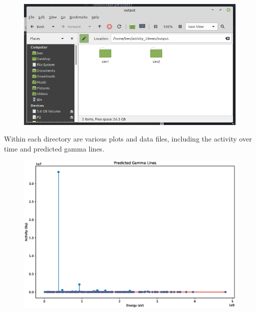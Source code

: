 \documentclass[12pt,twoside]{manual}
\begin{document}
\begin{figure}[h]
  \begin{center}
    \includegraphics[scale=0.30]{img/output1}
  \end{center}
\end{figure}

\FloatBarrier

Within each directory are various plots and data files, including the activity over time and predicted gamma lines.

\FloatBarrier

\begin{figure}[h]
  \begin{center}
    \includegraphics[scale=0.25]{img/end_of_beam_gamma_lines.eps}
  \end{center}
\end{figure}
\end{document}
